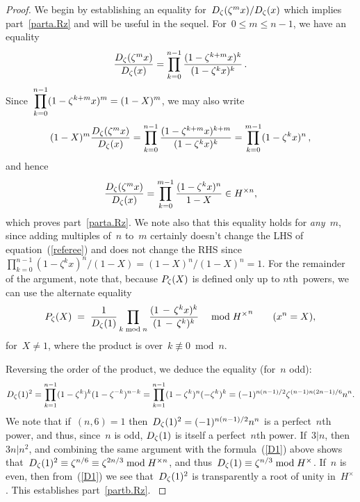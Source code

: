 \documentclass[12pt,reqno]{amsart}
\theoremstyle{definition}
\newcommand{\changed}[1]{{#1}}
\def\be{\begin{equation}}
\def\ee{\end{equation}}
\def\m{\,-\,}
\def\={\;=\;}
\def\mod{\;\text{\rm mod}\;}
\def\nn{n}
\begin{document}
\begin{proof}
  \changed{We begin by establishing an equality for~$D_{\zeta}(\zeta^m x)/D_{\zeta}(x)$
    which implies part~\ref{parta.Rz} and will be useful in the sequel.
For~$0 \le m \le n-1$, we have an equality
$$
\frac{D_{\zeta}(\zeta^m x)}{D_{\zeta}(x)} =
\prod_{k=0}^{n-1} \frac{(1 - \zeta^{k+m} x)^k}{(1 - \zeta^k x)^k} \,.
$$
Since~$\displaystyle{ \prod_{k=0}^{n-1} (1 - \zeta^{k+m} x)^m} = (1-X)^m$, we may also
 write
 $$
 (1 - X)^m \frac{D_{\zeta}(\zeta^m x)}{D_{\zeta}(x)} =
  \prod_{k=0}^{n-1} \frac{(1 - \zeta^{k+m} x)^{k+m}}{(1 - \zeta^k x)^k}
  = \prod_{k=0}^{m-1} (1 - \zeta^k x)^n \,,
 $$ and hence
  \be
  \label{referee}
   \frac{D_{\z}(\z^m x)}{D_{\z}(x)}  = \prod_{k=0}^{m-1} \frac{(1 - \z^k x)^n}{1 - X} 
   \in H^{\times n},
   \ee
      which proves part~\ref{parta.Rz}. We note also that this equality holds for \emph{any}~$m$,
     since adding multiples of~$n$ to~$m$ certainly doesn't change
     the LHS of equation~(\ref{referee}) and does not change
     the RHS since~$\prod_{k=0}^{n-1} (1 - \zeta^k x)^n/(1-X) = (1-X)^n/(1-X)^n = 1$.
For  the remainder of the argument,} note that,
because $P_\zeta(X)$ is defined only up to 
$\nn$th~powers, we can \changed{use the alternate equality}
\be
\label{16*}
P_\z(X) \=  \changed{\frac{1}{D_{\z}(1)}} \prod_{k\mod\nn}
\frac
{(1\m\z^kx)^k}
{(1\m\z^k)^k}
\quad\mod {H^\times}^\nn\qquad(x^n=X), 
\ee
\changed{for~$X \ne 1$,  where
the product is over~$k \not\equiv 0 \bmod \nn$.}

\changed{Reversing the order of the product,
we deduce the equality (for~$n$ odd):
\be
\label{D1}
D_{\z}(1)^2 =
 \prod_{k=1}^{n-1} (1 - \z^k)^k (1 - \z^{-k})^{n-k}
= \prod_{k=1}^{n-1} (1 - \z^k)^n (- \z^k)^k = (-1)^{n(n-1)/2} \z^{(n-1)n(2n-1)/6} n^n.
\ee
We note that if~$(n,6) = 1$ then~$D_{\zeta}(1)^2 =  (-1)^{n(n-1)/2} n^n$ is a perfect~$n$th power,
and thus, since~$n$ is odd, $D_{\zeta}(1)$ is itself a perfect~$n$th power.
If~$3|n$, then~$3n | n^2$, and combining the same argument with
the formula~(\ref{D1}) above shows that~$D_{\z}(1)^2 \equiv  \zeta^{n/6} 
\equiv \zeta^{2n/3} \mod H^{\times n}$, and thus~$D_{\z}(1) \equiv \zeta^{n/3} \mod H^{\times}$.
If~$n$ is even, then from~(\ref{D1}) we see that~$D_{\zeta}(1)^2$ is transparently
a root of unity in~$H^{\times}$.
This establishes part~\ref{partb.Rz}. 
}


\end{proof}
\end{document}

